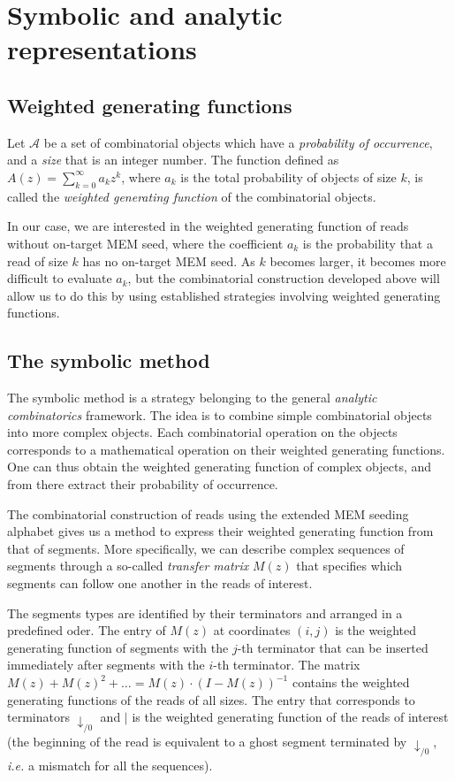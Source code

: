 \documentclass{article}
\begin{document}
\section{Symbolic and analytic representations}

\subsection{Weighted generating functions}

Let $\mathcal{A}$ be a set of combinatorial objects which have a
\emph{probability of occurrence}, and a \emph{size} that is an integer
number. The function defined as $A(z) = \sum_{k=0}^\infty a_kz^k$, where
$a_k$ is the total probability of objects of size $k$, is called the
\emph{weighted generating function} of the combinatorial objects.

In our case, we are interested in the weighted generating function of
reads without on-target MEM seed, where the coefficient $a_k$ is the
probability that a read of size $k$ has no on-target MEM seed. As $k$
becomes larger, it becomes more difficult to evaluate $a_k$, but the
combinatorial construction developed above will allow us to do this by
using established strategies involving weighted generating functions.


\subsection{The symbolic method}

The symbolic method is a strategy belonging to the general \emph{analytic
combinatorics} framework. The idea is to combine simple combinatorial
objects into more complex objects. Each combinatorial operation on the
objects corresponds to a mathematical operation on their weighted
generating functions. One can thus obtain the weighted generating function
of complex objects, and from there extract their probability of
occurrence.

The combinatorial construction of reads using the extended MEM seeding
alphabet gives us a method to express their weighted generating function
from that of segments. More specifically, we can describe complex
sequences of segments through a so-called \emph{transfer matrix} $M(z)$
that specifies which segments can follow one another in the reads of
interest.

The segments types are identified by their terminators and arranged in a
predefined oder. The entry of $M(z)$ at coordinates $(i,j)$ is the
weighted generating function of segments with the $j$-th terminator that
can be inserted immediately after segments with the $i$-th terminator. The
matrix $M(z) + M(z)^2 + \ldots = M(z) \cdot (I-M(z))^{-1}$ contains the
weighted generating functions of the reads of all sizes. The entry that
corresponds to terminators $\downarrow_{/0}$ and $|$ is the weighted
generating function of the reads of interest (the beginning of the read is
equivalent to a ghost segment terminated by $\downarrow_{/0}$,
\textit{i.e.} a mismatch for all the sequences).
\end{document}
